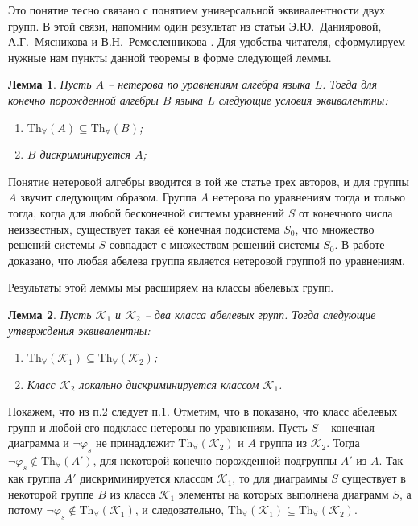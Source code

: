 \documentclass[a4paper,11pt,twoside]{article}
\newtheorem{lemma}{Лемма}[section]
\def\proof{{\noindent{\bf Доказательство.}} }
\def\K{{\mathcal{K}}}
\def\Tha{{\mathrm{Th}_\forall}}
\begin{document}
Это понятие тесно связано с понятием универсальной эквивалентности двух групп. В этой связи, напомним один результат из статьи Э.Ю.~Данияровой, А.Г.~Мясникова и В.Н.~Ремесленникова \cite{DMR1}. Для удобства читателя, сформулируем нужные нам пункты данной теоремы в форме следующей леммы.

\begin{lemma}\label{lemma:UnivEquiv}
Пусть $A$ -- нетерова по уравнениям алгебра языка $L$. Тогда для конечно порожденной алгебры $B$ языка $L$ следующие условия эквивалентны:
\begin{enumerate}
\item $\mathrm{Th}_{\forall}(A) \subseteq \mathrm{Th}_{\forall}(B)$;
\item $B$ дискриминируется $A$;
\end{enumerate}
\end{lemma}

Понятие нетеровой алгебры вводится в той же статье трех авторов, и для группы $A$ звучит следующим образом. Группа $A$ нетерова по уравнениям тогда и только тогда, когда для любой бесконечной системы уравнений $S$ от конечного числа неизвестных, существует такая её конечная подсистема $S_0$, что множество решений системы $S$ совпадает с множеством решений системы $S_0$. В работе \cite{DMR2} доказано, что любая абелева группа является нетеровой группой по уравнениям.

Результаты этой леммы мы расширяем на классы абелевых групп.

\begin{lemma}\label{lemma:UnivEquivForClass}
Пусть $\K_1$ и $\K_2$ -- два класса абелевых групп. Тогда следующие утверждения эквивалентны:
\begin{enumerate}
\item $\Tha(\K_1) \subseteq \Tha(\K_2)$;
\item Класс $\K_2$ локально дискриминируется классом $\K_1$.
\end{enumerate}
\end{lemma}

\proof Покажем, что из п.2 следует п.1. Отметим, что в \cite{DMR2} показано, что класс абелевых групп и любой его подкласс нетеровы по уравнениям. Пусть $S$ -- конечная диаграмма и $\neg \varphi_s$ не принадлежит $\Tha(\K_2)$ и $A$ группа из $\K_2$. Тогда $\neg \varphi_s \notin \Tha(A')$, для некоторой конечно порожденной подгруппы $A'$ из $A$. Так как группа $A'$ дискриминируется классом $\K_1$, то для диаграммы $S$ существует в некоторой группе $B$ из класса $\K_1$ элементы на которых выполнена диаграмм $S$, а потому $\neg \varphi_s \notin \Tha(\K_1)$, и следовательно, $\Tha(\K_1) \subseteq \Tha(\K_2)$.
\end{document}
